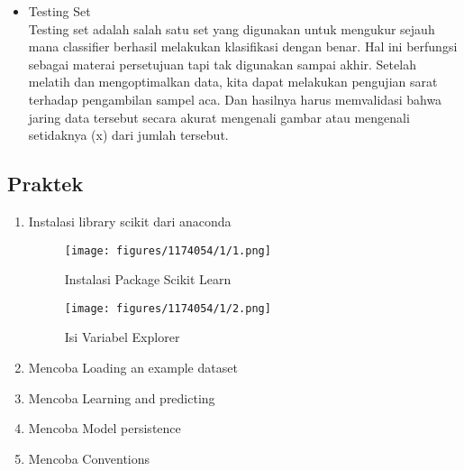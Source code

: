 \begin{enumerate}
\begin{itemize}
\item Testing Set\\
Testing set adalah salah satu set yang digunakan untuk mengukur sejauh mana classifier berhasil melakukan klasifikasi dengan benar. Hal ini berfungsi sebagai materai persetujuan tapi tak digunakan sampai akhir. Setelah melatih dan mengoptimalkan data, kita dapat melakukan pengujian sarat terhadap pengambilan sampel aca. Dan hasilnya harus memvalidasi bahwa jaring data tersebut secara akurat mengenali gambar atau mengenali setidaknya (x) dari jumlah tersebut.

\end{itemize}
\end{enumerate}

\subsection{Praktek}
\begin{enumerate}
\item Instalasi library scikit dari anaconda
\hfill\break
	\begin{figure}[H]
		\texttt{[image: figures/1174054/1/1.png]}
		\centering
		\caption{Instalasi Package Scikit Learn}
	\end{figure}
	\begin{figure}[H]
		\texttt{[image: figures/1174054/1/2.png]}
		\centering
		\caption{Isi Variabel Explorer}
	\end{figure}
\item Mencoba Loading an example dataset
\hfill\break
	
	
\item Mencoba Learning and predicting
\hfill\break
	
	
\item Mencoba Model persistence
\hfill\break
	
	
\item Mencoba Conventions
\hfill\break
	
\end{enumerate}

